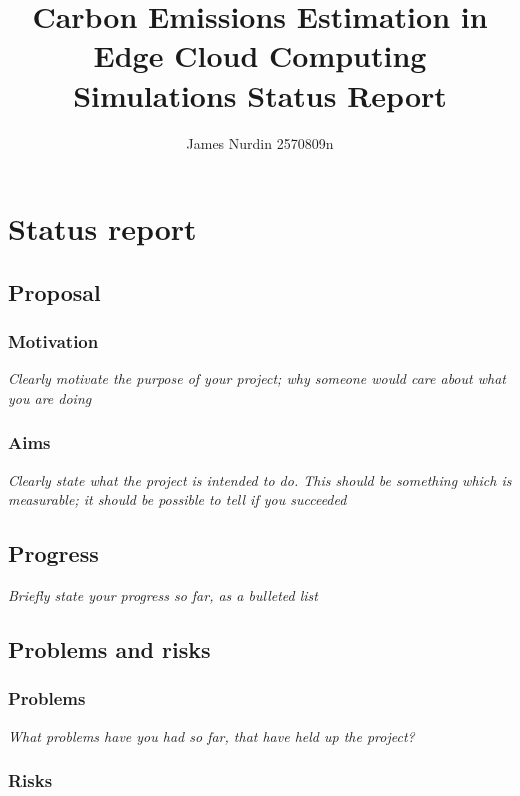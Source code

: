 \documentclass[11pt]{article}
\title{Carbon Emissions Estimation in Edge Cloud Computing Simulations Status Report}
\author{James Nurdin 2570809n}
\begin{document}
    \maketitle
    
    
     

\section{Status report}

\subsection{Proposal}\label{proposal}

\subsubsection{Motivation}\label{motivation}

\emph{{{}Clearly motivate the purpose of your project; why someone would
care about what you are doing{}}}

\subsubsection{Aims}\label{aims}

\emph{{{}Clearly state what the project is intended to do. This should
be something which is measurable; it should be possible to tell if you
succeeded{}}}

\subsection{Progress}\label{progress}

\emph{{{}Briefly state your progress so far, as a bulleted list{}}}

\subsection{Problems and risks}\label{problems-and-risks}

\subsubsection{Problems}\label{problems}

\emph{{{}What problems have you had so far, that have held up the
project?{}}}

\subsubsection{Risks}\label{risks}
\end{document}
